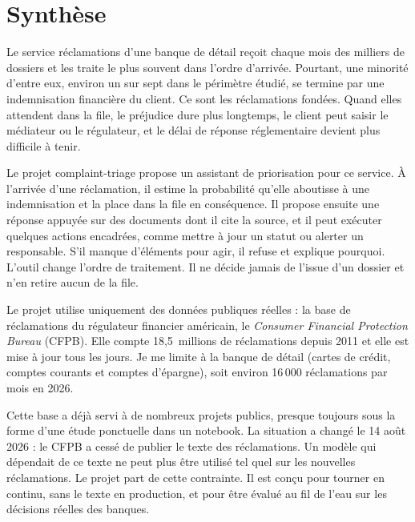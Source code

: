 \documentclass[11pt,a4paper]{article}
\begin{document}

\setcounter{tocdepth}{1}
\tableofcontents
\newpage

\section*{Synthèse}

Le service réclamations d'une banque de détail reçoit chaque mois des milliers de dossiers et les traite le plus souvent dans l'ordre d'arrivée. Pourtant, une minorité d'entre eux, environ un sur sept dans le périmètre étudié, se termine par une indemnisation financière du client. Ce sont les réclamations fondées. Quand elles attendent dans la file, le préjudice dure plus longtemps, le client peut saisir le médiateur ou le régulateur, et le délai de réponse réglementaire devient plus difficile à tenir.

Le projet complaint-triage propose un assistant de priorisation pour ce service. À l'arrivée d'une réclamation, il estime la probabilité qu'elle aboutisse à une indemnisation et la place dans la file en conséquence. Il propose ensuite une réponse appuyée sur des documents dont il cite la source, et il peut exécuter quelques actions encadrées, comme mettre à jour un statut ou alerter un responsable. S'il manque d'éléments pour agir, il refuse et explique pourquoi. L'outil change l'ordre de traitement. Il ne décide jamais de l'issue d'un dossier et n'en retire aucun de la file.

Le projet utilise uniquement des données publiques réelles : la base de réclamations du régulateur financier américain, le \emph{Consumer Financial Protection Bureau} (CFPB). Elle compte 18,5~millions de réclamations depuis 2011 et elle est mise à jour tous les jours. Je me limite à la banque de détail (cartes de crédit, comptes courants et comptes d'épargne), soit environ 16\,000 réclamations par mois en 2026.

Cette base a déjà servi à de nombreux projets publics, presque toujours sous la forme d'une étude ponctuelle dans un notebook. La situation a changé le 14 août 2026 : le CFPB a cessé de publier le texte des réclamations. Un modèle qui dépendait de ce texte ne peut plus être utilisé tel quel sur les nouvelles réclamations. Le projet part de cette contrainte. Il est conçu pour tourner en continu, sans le texte en production, et pour être évalué au fil de l'eau sur les décisions réelles des banques.
\end{document}
